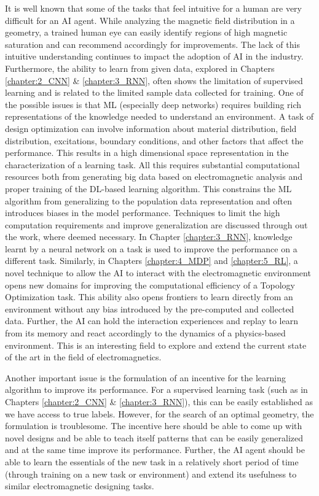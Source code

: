 It is well known that some of the tasks that feel intuitive for a human are very difficult for an AI agent. While analyzing the magnetic field distribution in a geometry, a trained human eye can easily identify regions of high magnetic saturation and can recommend accordingly for improvements. The lack of this intuitive understanding continues to impact the adoption of AI in the industry. Furthermore, the ability to learn from given data, explored in Chapters \ref{chapter:2_CNN} \& \ref{chapter:3_RNN}, often shows the limitation of supervised learning and is related to the limited sample data collected for training. One of the possible issues is that ML (especially deep networks) requires building rich representations of the knowledge needed to understand an environment. A task of design optimization can involve information about material distribution, field distribution, excitations, boundary conditions, and other factors that affect the performance. This results in a high dimensional space representation in the characterization of a learning task. All this requires substantial computational resources both from generating big data based on electromagnetic analysis and proper training of the DL-based learning algorithm. This constrains the ML algorithm from generalizing to the population data representation and often introduces biases in the model performance. Techniques to limit the high computation requirements and improve generalization are discussed through out the work, where deemed necessary. In Chapter \ref{chapter:3_RNN}, knowledge learnt by a neural network on a task is used to improve the performance on a different task. Similarly, in Chapters \ref{chapter:4_MDP} and \ref{chapter:5_RL}, a novel technique to allow the AI to interact with the electromagnetic environment opens new domains for improving the computational efficiency of a Topology Optimization task. This ability also opens frontiers to learn directly from an environment without any bias introduced by the pre-computed and collected data. Further, the AI can hold the interaction experiences and replay to learn from its memory and react accordingly to the dynamics of a physics-based environment. This is an interesting field to explore and extend the current state of the art in the field of electromagnetics.

Another important issue is the formulation of an incentive for the learning algorithm to improve its performance. For a supervised learning task (such as in Chapters \ref{chapter:2_CNN} \& \ref{chapter:3_RNN}), this can be easily established as we have access to true labels. However, for the search of an optimal geometry, the formulation is troublesome. The incentive here should be able to come up with novel designs and be able to teach itself patterns that can be easily generalized and at the same time improve its performance. Further, the AI agent should be able to learn the essentials of the new task in a relatively short period of time (through training on a new task or environment) and extend its usefulness to similar electromagnetic designing tasks.

